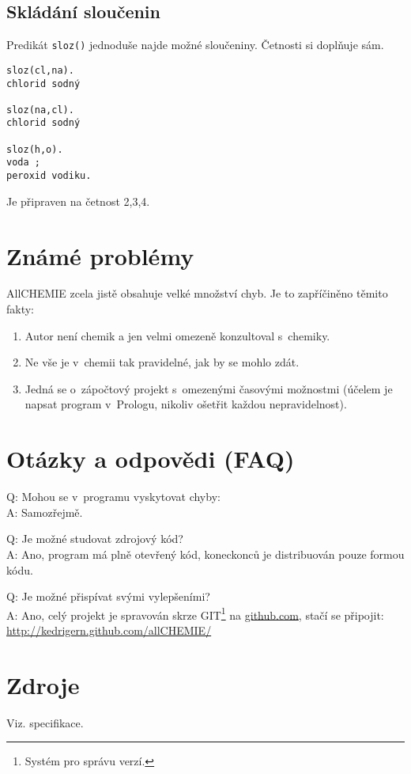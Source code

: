 \documentclass[a4paper]{article}
\begin{document}
\subsection{Skládání sloučenin}
Predikát \texttt{sloz()} jednoduše najde možné sloučeniny. Četnosti si doplňuje sám. 
\begin{verbatim}
sloz(cl,na).
chlorid sodný

sloz(na,cl).
chlorid sodný

sloz(h,o).
voda ;
peroxid vodiku.
\end{verbatim}
Je připraven na četnost 2,3,4.
\section{Známé problémy}
AllCHEMIE zcela jistě obsahuje velké množství chyb. Je to zapříčiněno těmito fakty:
\begin{enumerate}
\item Autor není chemik a jen velmi omezeně konzultoval s~chemiky.
\item Ne vše je v~chemii tak pravidelné, jak by se mohlo zdát.
\item Jedná se o~zápočtový projekt s~omezenými časovými možnostmi (účelem je napsat program v~Prologu, nikoliv ošetřit každou nepravidelnost).
\end{enumerate}

\section{Otázky a odpovědi (FAQ)}
Q: Mohou se v~programu vyskytovat chyby:\\
A: Samozřejmě.

\medskip

Q: Je možné studovat zdrojový kód?\\
A: Ano, program má plně otevřený kód, koneckonců je distribuován pouze formou kódu.

\medskip

Q: Je možné přispívat svými vylepšeními?\\
A: Ano, celý projekt je spravován skrze GIT\footnote{Systém pro správu verzí.} na \href{github.com}{github.com}, stačí se připojit:
\href{http://kedrigern.github.com/allCHEMIE/}{http://kedrigern.github.com/allCHEMIE/}
\section{Zdroje}
Viz. specifikace.
\end{document}
